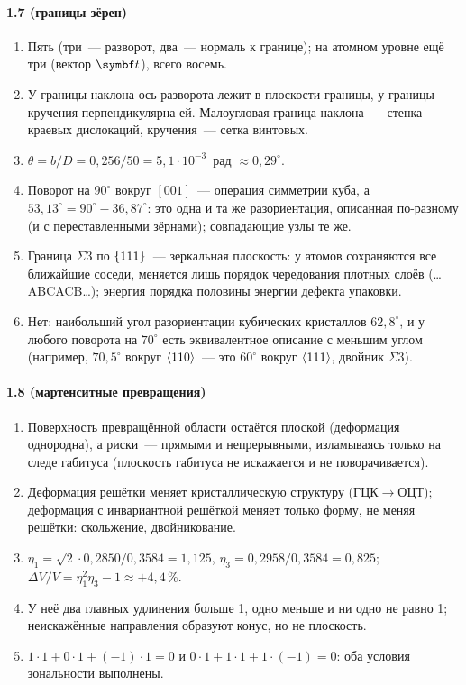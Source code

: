 {\paragraph{1.7 (границы зёрен)}
\begin{enumerate}[label=\arabic*.]
\item Пять (три~— разворот, два~— нормаль к границе); на атомном уровне
ещё три (вектор $\vb t$), всего восемь.
\item У границы наклона ось разворота лежит в плоскости границы, у границы
кручения перпендикулярна ей. Малоугловая граница наклона~— стенка
краевых дислокаций, кручения~— сетка винтовых.
\item $\theta=b/D=0{,}256/50=5{,}1\cdot10^{-3}$~рад $\approx0{,}29^\circ$.
\item Поворот на $90^\circ$ вокруг $[001]$~— операция симметрии куба, а
$53{,}13^\circ=90^\circ-36{,}87^\circ$: это одна и та же разориентация,
описанная по-разному (и с переставленными зёрнами); совпадающие узлы те же.
\item Граница $\Sigma3$ по $\{111\}$~— зеркальная плоскость: у атомов
сохраняются все ближайшие соседи, меняется лишь порядок чередования
плотных слоёв (\ldots ABCACB\ldots); энергия порядка половины энергии
дефекта упаковки.
\item Нет: наибольший угол разориентации кубических кристаллов
$62{,}8^\circ$, и у любого поворота на $70^\circ$ есть эквивалентное описание
с меньшим углом (например, $70{,}5^\circ$ вокруг $\langle 110\rangle$~— это
$60^\circ$ вокруг $\langle 111\rangle$, двойник $\Sigma3$).
\end{enumerate}

\paragraph{1.8 (мартенситные превращения)}
\begin{enumerate}[label=\arabic*.]
\item Поверхность превращённой области остаётся плоской (деформация
однородна), а риски~— прямыми и непрерывными, изламываясь только на
следе габитуса (плоскость габитуса не искажается и не поворачивается).
\item Деформация решётки меняет кристаллическую структуру (ГЦК$\to$ОЦТ);
деформация с инвариантной решёткой меняет только форму, не меняя
решётки: скольжение, двойникование.
\item $\eta_1=\sqrt2\cdot0{,}2850/0{,}3584=1{,}125$, $\eta_3=0{,}2958/0{,}3584=0{,}825$;
$\Delta V/V=\eta_1^2\eta_3-1\approx+4{,}4\,\%$.
\item У неё два главных удлинения больше 1, одно меньше и ни одно не
равно 1; неискажённые направления образуют конус, но не плоскость.
\item $1\cdot1+0\cdot1+(-1)\cdot1=0$ и $0\cdot1+1\cdot1+1\cdot(-1)=0$: оба
условия зональности выполнены.
\end{enumerate}
}


